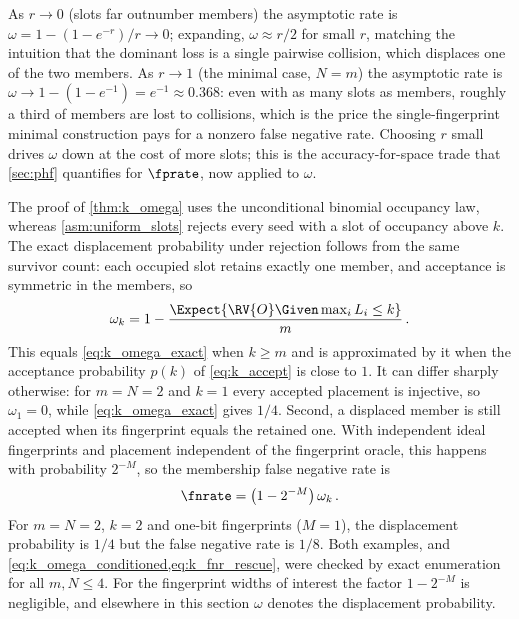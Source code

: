 \documentclass[ ../main.tex]{subfiles}
\begin{document}
\begin{remark}
\label{rem:omega_limits}
As $r \to 0$ (slots far outnumber members) the asymptotic rate is $\omega = 1 - (1-e^{-r})/r \to 0$; expanding, $\omega \approx r/2$ for small $r$, matching the intuition that the dominant loss is a single pairwise collision, which displaces one of the two members. As $r \to 1$ (the minimal case, $N = m$) the asymptotic rate is $\omega \to 1 - (1 - e^{-1}) = e^{-1} \approx 0.368$: even with as many slots as members, roughly a third of members are lost to collisions, which is the price the single-fingerprint minimal construction pays for a nonzero false negative rate. Choosing $r$ small drives $\omega$ down at the cost of more slots; this is the accuracy-for-space trade that \cref{sec:phf} quantifies for $\fprate$, now applied to $\omega$.
\end{remark}

\begin{remark}
\label{rem:k_omega_conditioned}
The proof of \cref{thm:k_omega} uses the unconditional binomial occupancy law, whereas \cref{asm:uniform_slots} rejects every seed with a slot of occupancy above $k$. The exact displacement probability under rejection follows from the same survivor count: each occupied slot retains exactly one member, and acceptance is symmetric in the members, so
\begin{equation}
\label{eq:k_omega_conditioned}
    \omega_k = 1 - \frac{\Expect{\RV{O} \Given \max_i L_i \le k}}{m}\,.
\end{equation}
This equals \cref{eq:k_omega_exact} when $k \ge m$ and is approximated by it when the acceptance probability $p(k)$ of \cref{eq:k_accept} is close to $1$. It can differ sharply otherwise: for $m = N = 2$ and $k = 1$ every accepted placement is injective, so $\omega_1 = 0$, while \cref{eq:k_omega_exact} gives $1/4$. Second, a displaced member is still accepted when its fingerprint equals the retained one. With independent ideal fingerprints and placement independent of the fingerprint oracle, this happens with probability $2^{-M}$, so the membership false negative rate is
\begin{equation}
\label{eq:k_fnr_rescue}
    \fnrate = \bigl(1 - 2^{-M}\bigr)\,\omega_k\,.
\end{equation}
For $m = N = 2$, $k = 2$ and one-bit fingerprints ($M = 1$), the displacement probability is $1/4$ but the false negative rate is $1/8$. Both examples, and \cref{eq:k_omega_conditioned,eq:k_fnr_rescue}, were checked by exact enumeration for all $m, N \le 4$. For the fingerprint widths of interest the factor $1 - 2^{-M}$ is negligible, and elsewhere in this section $\omega$ denotes the displacement probability.
\end{remark}
\end{document}
